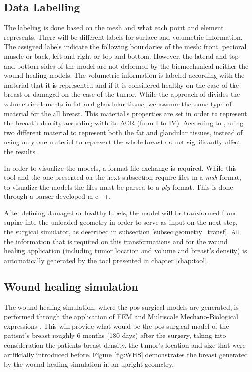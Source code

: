 \subsection{Data Labelling}\label{subsection:labelling}

The labeling is done based on the mesh and what each point and element represents. There will be different labels for surface and volumetric information. The assigned labels indicate the following boundaries of the mesh: front, pectoral muscle or back, left and right or top and bottom. However, the lateral and top and bottom sides of the model are not deformed by the biomechanical neither the wound healing models. The volumetric information is labeled according with the material that it is represented and if it is considered healthy on the case of the breast or damaged on the case of the tumor. While the approach of \cite{Vavourakis2016} divides the volumetric elements in fat and glandular tissue, we assume the same type of material for the all breast. This material's properties are set in order to represent the breast's density according with its ACR (from I to IV). According to \cite{Engineering2008}, using two different material to represent both the fat and glandular tissues, instead of using only one material to represent the whole breast do not significantly affect the results.

In order to visualize the models, a format file exchange is required. While this tool and the one presented on the next subsection require files in a \textit{msh} format, to visualize the models the files must be parsed to a \textit{ply} format. This is done through a parser developed in c++.

After defining damaged or healthy labels, the model will be transformed from supine into the unloaded geometry in order to serve as input on the next step, the surgical simulator, as described in subsection \ref{subsec:geometry_transf}. All the information that is required on this transformations and for the wound healing application (including tumor location and volume and breast's density) is automatically generated by the tool presented in chapter \ref{chap:tool}.


\subsection{Wound healing simulation}\label{subsection:wound_healing_simulation}

The wound healing simulation, where the pos-surgical models are generated, is performed through the application of FEM and Multiscale Mechano-Biological expressions \cite{Vavourakis2016}. 
This will provide what would be the pos-surgical model of the patient's breast roughly 6 months (180 days) after the surgery, taking into consideration the patients breast density, the tumor's location and size that were artificially introduced before. Figure \ref{fig:WHS} demonstrates the breast generated by the wound healing simulation in an upright geometry.

